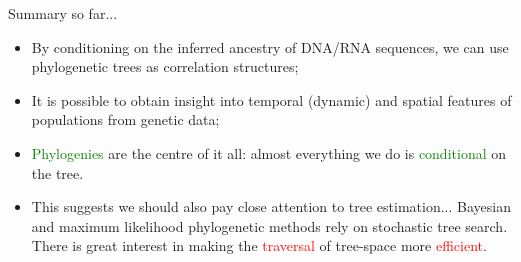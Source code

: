 \begin{frame}{Summary so far...}
\begin{itemize}
 \item By conditioning on the inferred ancestry of DNA/RNA sequences, we can use phylogenetic trees as correlation structures;
 \item It is possible to obtain insight into temporal (dynamic) and spatial features of populations from genetic data;
 \item \textcolor{green}{Phylogenies} are  the centre of it all: almost everything we do is \textcolor{green}{conditional} on the tree.\pause
 \item This suggests we should also pay close attention to tree estimation...
 Bayesian and maximum likelihood phylogenetic methods rely on stochastic tree search. There is great interest in making the \textcolor{red}{traversal} of tree-space more \textcolor{red}{efficient}.
\end{itemize}
\end{frame}
